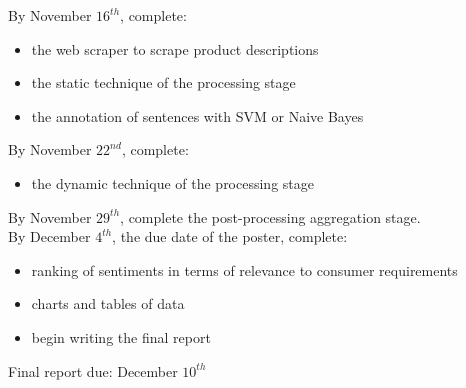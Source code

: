 \documentclass{article}
\begin{document}
By November $16^{th}$, complete:
\begin{itemize}
\item the web scraper to scrape product descriptions
\item the static technique of the processing stage 
\item the annotation of sentences with SVM or Naive Bayes 
\end{itemize}
By November $22^{nd}$, complete:
\begin{itemize}
\item the dynamic technique of the processing stage
\end{itemize}
By November $29^{th}$, complete the post-processing aggregation stage.
\newline \\
By December $4^{th}$, the due date of the poster, complete:
\begin{itemize}
\item 
ranking of sentiments in terms of relevance to consumer requirements 
\item charts and tables of data
\item begin writing the final report 
\end{itemize}

Final report due: December $10^{th}$
\end{document}
